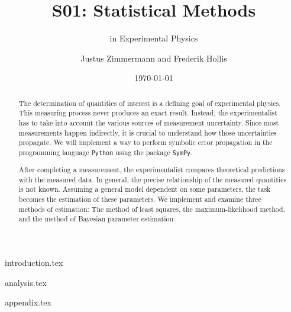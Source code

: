 \documentclass[a4paper, 11pt]{scrartcl}
\title{S01: Statistical Methods}
\subtitle{in Experimental Physics}
\author{Justus Zimmermann and Frederik Hollis}
\date{\today}
\begin{document}
\maketitle

\begin{abstract}
    The determination of quantities of interest is a defining goal of experimental physics.
    This measuring process never produces an exact result.
    Instead, the experimentalist has to take into account the various sources of measurement uncertainty.
    Since most measurements happen indirectly, it is crucial to understand how those uncertainties propagate.
    We will implement a way to perform symbolic error propagation in the programming language \verb|Python| using the package \verb|SymPy|.

    After completing a measurement, the experimentalist compares theoretical predictions with the measured data.
    In general, the precise relationship of the measured quantities is not known.
    Assuming a general model dependent on some parameters, the task becomes the estimation of these parameters.
    We implement and examine three methods of estimation: 
    The method of least squares, the maximum-likelihood method, and the method of Bayesian parameter estimation.
\end{abstract}

\tableofcontents

\clearpage
{introduction.tex}

\clearpage
{analysis.tex}

\clearpage
\appendix
{appendix.tex}
\printbibliography
\end{document}
